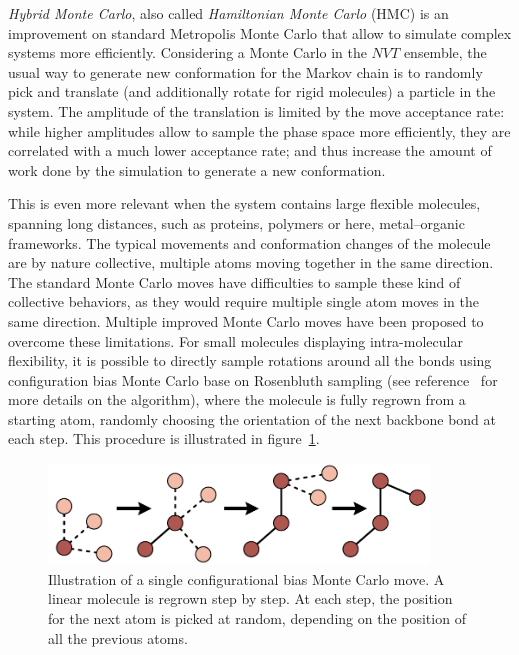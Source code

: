 \documentclass[thesis]{subfiles}
\begin{document}
\emph{Hybrid Monte Carlo}, also called \emph{Hamiltonian Monte Carlo} (HMC) is
an improvement on standard Metropolis Monte Carlo that allow to simulate complex
systems more efficiently. Considering a Monte Carlo in the $NVT$ ensemble, the
usual way to generate new conformation for the Markov chain is to randomly pick
and translate (and additionally rotate for rigid molecules) a particle in the
system. The amplitude of the translation is limited by the move acceptance rate:
while higher amplitudes allow to sample the phase space more efficiently, they
are correlated with a much lower acceptance rate; and thus increase the amount
of work done by the simulation to generate a new conformation.

This is even more relevant when the system contains large flexible molecules,
spanning long distances, such as proteins, polymers or here, metal--organic
frameworks. The typical movements and conformation changes of the molecule are
by nature collective, multiple atoms moving together in the same direction. The
standard Monte Carlo moves have difficulties to sample these kind of collective
behaviors, as they would require multiple single atom moves in the same
direction. Multiple improved Monte Carlo moves have been proposed to overcome
these limitations. For small molecules displaying intra-molecular flexibility,
it is possible to directly sample rotations around all the bonds using
configuration bias Monte Carlo base on Rosenbluth sampling (see
reference~\cite{Frenkel1997} for more details on the algorithm), where the
molecule is fully regrown from a starting atom, randomly choosing the
orientation of the next backbone bond at each step.  This procedure is
illustrated in figure~\ref{fig:cbmc}.

\begin{figure}[ht]
    \centering
    \includegraphics[width=0.9\textwidth]{figures/images/cbmc}
    \caption{Illustration of a single configurational bias Monte Carlo move. A
    linear molecule is regrown step by step. At each step, the position for the
    next atom is picked at random, depending on the position of all the
    previous atoms.}
    \label{fig:cbmc}
\end{figure}
\end{document}

